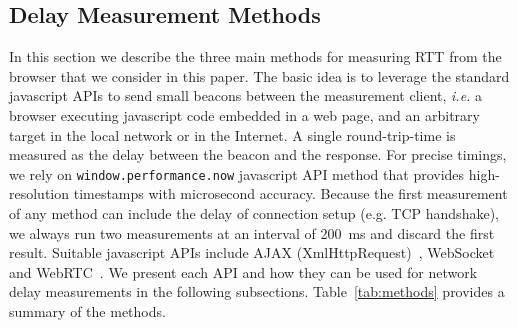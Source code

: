 \documentclass{sig-alternate-10pt}
\begin{document}


\subsection{Delay Measurement Methods}
\label{subsec:methods}

In this section we describe the three main methods for measuring RTT from the browser that we consider in this paper. The basic idea is to leverage the standard javascript APIs to send small beacons between the measurement client, \emph{i.e.} a browser executing javascript code embedded in a web page, and an arbitrary target in the local network or in the Internet. A single round-trip-time is measured as the delay between the beacon and the response. For precise timings, we rely on \texttt{window.performance.now} javascript API method that provides high-resolution timestamps with microsecond accuracy. Because the first measurement of any method can include the delay of connection setup (e.g. TCP handshake), we always run two measurements at an interval of 200~ms and discard the first result.
%
Suitable javascript APIs  include AJAX (XmlHttpRequest)~\cite{w3c_xmlhttprequest_????}, WebSocket~\cite{w3c_websocket_????} and WebRTC~\cite{w3c_webrtc_????}. We present each API and how they can be used for network delay measurements in the following subsections. 
Table~\ref{tab:methods} provides a summary of the methods. %
\end{document}
